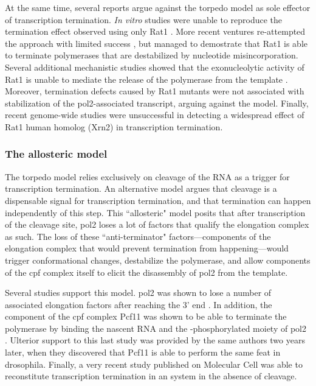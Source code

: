 At the same time, several reports argue against the torpedo model as sole effector of transcription termination.
\emph{In vitro} studies were unable to reproduce the termination effect observed \invivo{} using only Rat1 \citep{dengl:2009:torpedo}. More recent ventures re-attempted the \invitro{} approach with limited success \citep{park:2015:unraveling}, but managed to demostrate that Rat1 is able to terminate polymerases that are destabilized by nucleotide misincorporation.
Several additional mechanistic studies showed that the exonucleolytic activity of Rat1 is unable to mediate the release of the polymerase from the template \citep{luo:2006:role, pearson:2013:dismantling}.
Moreover, termination defects caused by Rat1 mutants were not associated with stabilization of the \gls{pol2}-associated transcript, arguing against the model.
Finally, recent genome-wide studies were unsuccessful in detecting a widespread effect of Rat1 human homolog (Xrn2) in transcription termination\citep{nojima:2015:mammalian}.


\subsubsection{The allosteric model}

The torpedo model relies exclusively on cleavage of the RNA as a trigger for transcription termination.
An alternative model argues that cleavage is a dispensable signal for transcription termination, and that termination can happen independently of this step.
This ``allosteric" model posits that after transcription of the cleavage site, \gls{pol2} loses a lot of factors that qualify the elongation complex as such.
The loss of these ``anti-terminator" factors---components of the elongation complex that would prevent termination from happening---would trigger conformational changes, destabilize the polymerase, and allow components of the \gls{cpf} complex itself to elicit the disassembly of \gls{pol2} from the template.

Several studies support this model. 
\gls{pol2} was shown to lose a number of associated elongation factors after reaching the 3' end \citep{kim:2004:transitions}.
In addition, the component of the \gls{cpf} complex Pcf11 was shown to be able to terminate the polymerase \invitro{} by binding the nascent RNA and the \sert{}-phosphorylated moiety of \gls{pol2} \citep{zhang:2005:ctddependent}.
Ulterior support to this last study was provided by the same authors two years later, when they discovered that Pcf11 is able to perform the same feat in drosophila\citep{zhang:2006:pcf11}.
Finally, a very recent study published on Molecular Cell was able to reconstitute transcription termination in an \invitro{} system in the absence of cleavage\citep{zhang:2015:polya}.

